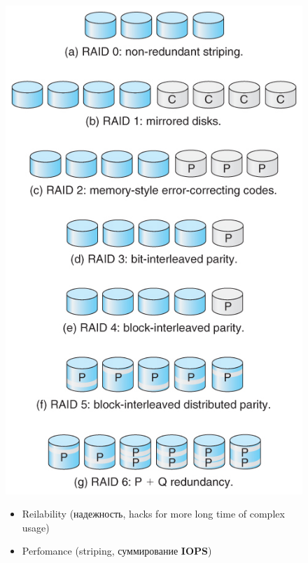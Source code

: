 \documentclass[../../lectures.tex]{subfiles}
\begin{document}
\begin{figure}[H]
\captionsetup{singlelinecheck=off}
\begin{minipage}[c]{0.5\linewidth}
\centering
\includegraphics[width=\textwidth]{images/raid-levels.jpg}
\end{minipage}
\begin{minipage}[c]{0.5\linewidth}
\centering
\begin{itemize}
    \item Reilability (надежность, hacks for more long time of complex usage)
    \item Perfomance (striping, суммирование \textbf{IOPS})

\end{itemize}
\end{minipage}
\end{figure}
\end{document}
